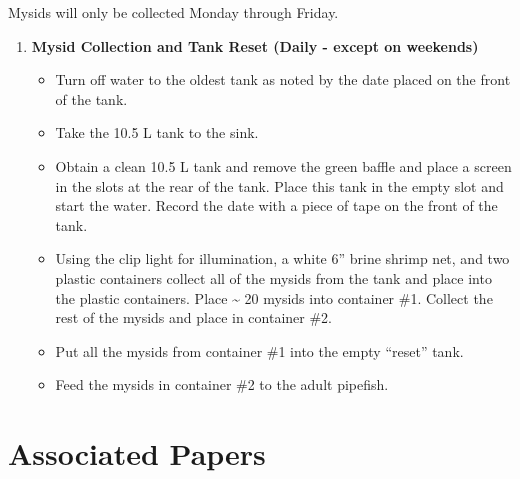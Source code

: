 \documentclass[
  letterpaper,
  DIV=11,
  numbers=noendperiod]{scrreprt}
\providecommand{\tightlist}{%
  \setlength{\itemsep}{0pt}\setlength{\parskip}{0pt}}\usepackage{longtable,booktabs,array}
\begin{document}
\begin{tcolorbox}[enhanced jigsaw, rightrule=.15mm, title=\textcolor{quarto-callout-note-color}{\faInfo}\hspace{0.5em}{This is a callout NOTE}, titlerule=0mm, opacitybacktitle=0.6, toprule=.15mm, bottomrule=.15mm, opacityback=0, left=2mm, colframe=quarto-callout-note-color-frame, breakable, coltitle=black, colback=white, colbacktitle=quarto-callout-note-color!10!white, bottomtitle=1mm, leftrule=.75mm, toptitle=1mm, arc=.35mm]

Mysids will only be collected Monday through Friday.

\end{tcolorbox}

\begin{enumerate}
\def\labelenumi{\arabic{enumi}.}
\setcounter{enumi}{2}
\tightlist
\item
  \textbf{Mysid Collection and Tank Reset (Daily - except on weekends)}

  \begin{itemize}
  \tightlist
  \item
    Turn off water to the oldest tank as noted by the date placed on the
    front of the tank.
  \item
    Take the 10.5 L tank to the sink.
  \item
    Obtain a clean 10.5 L tank and remove the green baffle and place a
    screen in the slots at the rear of the tank. Place this tank in the
    empty slot and start the water. Record the date with a piece of tape
    on the front of the tank.
  \item
    Using the clip light for illumination, a white 6'' brine shrimp net,
    and two plastic containers collect all of the mysids from the tank
    and place into the plastic containers. Place \textasciitilde{} 20
    mysids into container \#1. Collect the rest of the mysids and place
    in container \#2.
  \item
    Put all the mysids from container \#1 into the empty ``reset'' tank.
  \item
    Feed the mysids in container \#2 to the adult pipefish.
  \end{itemize}
\end{enumerate}

\hypertarget{associated-papers-23}{%
\section{Associated Papers}\label{associated-papers-23}}
\end{document}
